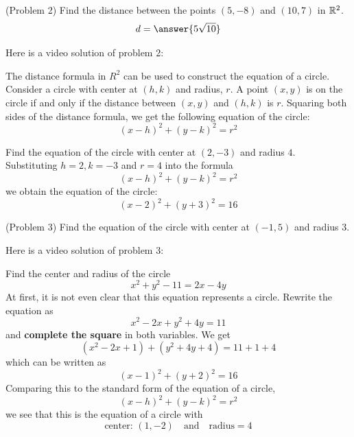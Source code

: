 \documentclass[handout]{ximera}
\begin{document}
\begin{problem}(Problem 2)
Find the distance between the points $(5,-8)$ and $(10,7)$ in $\mathbb R^2$.\\
\[
d = \answer{5\sqrt{10}}
\]
\end{problem}

Here is a video solution of problem 2:\\
\begin{foldable}
\end{foldable}

The distance formula in $R^2$ can be used to construct the equation of a circle. Consider a circle with center at $(h,k)$ and radius, $r$.
A point $(x,y)$ is on the circle if and only if the distance between $(x,y)$ and $(h,k)$ is $r$. 
Squaring both sides of the distance formula, we get the following equation of the circle: 
\[
(x-h)^2 + (y-k)^2 = r^2
\]

\begin{example}[Example 3]
Find the equation of the circle with center at $(2, -3)$ and radius $4$.\\
Substituting $h = 2, k = -3$ and $r =4$ into the formula
\[
(x-h)^2 + (y-k)^2 = r^2
\]
we obtain the equation of the circle:
\[
(x-2)^2 + (y+3)^2 = 16
\]
\end{example}

\begin{problem}(Problem 3)
Find the equation of the circle with center at $(-1, 5)$ and radius $3$.
\begin{multipleChoice}
\end{multipleChoice}
\end{problem}

Here is a video solution of problem 3:\\
\begin{foldable}
\end{foldable}

\begin{example}[Example 4]
Find the center and radius of the circle 
\[
x^2 + y^2 -11 = 2x - 4y
\]
At first, it is not even clear that this equation represents a circle.  Rewrite the equation as
\[
x^2 - 2x + y^2 + 4y = 11
\]
and {\bf complete the square} in both variables. We get
\[
(x^2 - 2x + 1) + (y^2 + 4y + 4) = 11 + 1 + 4
\]
which can be written as 
\[
(x-1)^2 +(y+2)^2 = 16
\]
Comparing this to the standard form of the equation of a circle,
\[
(x-h)^2 + (y-k)^2 = r^2
\]
we see that this is the equation of a circle with 
\[
\text{center: } (1, -2) \quad  \text{and} \quad \text{radius} = 4
\]
\end{example}
\end{document}
